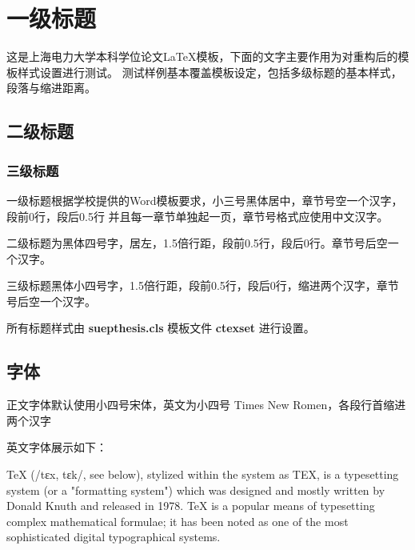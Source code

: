 %
%
%
%
%

\chapter{一级标题}

这是上海电力大学本科学位论文\LaTeX{}模板，下面的文字主要作用为对重构后的模板样式设置进行测试。
测试样例基本覆盖模板设定，包括多级标题的基本样式，段落与缩进距离。

\section{二级标题}

\subsection{三级标题}

一级标题根据学校提供的Word模板要求，小三号黑体居中，章节号空一个汉字，段前0行，段后0.5行
并且每一章节单独起一页，章节号格式应使用中文汉字。

二级标题为黑体四号字，居左，1.5倍行距，段前0.5行，段后0行。章节号后空一个汉字。

三级标题黑体小四号字，1.5倍行距，段前0.5行，段后0行，缩进两个汉字，章节号后空一个汉字。

所有标题样式由 \textbf{suepthesis.cls} 模板文件 \textbf{ctexset} 进行设置。

\section{字体}

正文字体默认使用小四号宋体，英文为小四号 Times New Romen，各段行首缩进两个汉字



英文字体展示如下：

TeX (/tɛx, tɛk/, see below), stylized within the system as TEX, is a typesetting system (or a "formatting system") which was designed and mostly written by Donald Knuth\cite{knuth1984texbook} and released in 1978. TeX is a popular means of typesetting complex mathematical formulae; it has been noted as one of the most sophisticated digital typographical systems.


